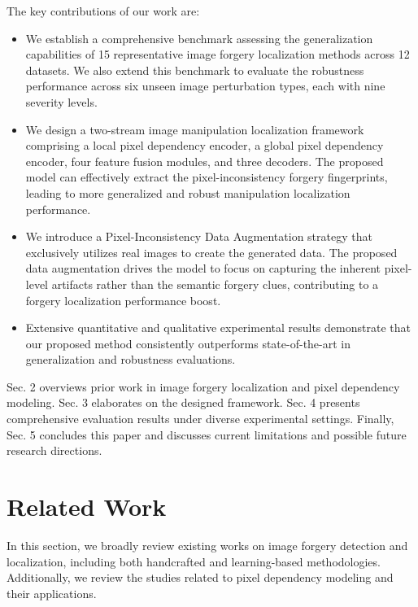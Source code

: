 \documentclass[10pt,journal,compsoc]{IEEEtran}
\begin{document}
The key contributions of our work are:
\begin{itemize}
    \item We establish a comprehensive benchmark assessing the generalization capabilities of 15 representative image forgery localization methods across 12 datasets. We also extend this benchmark to evaluate the robustness performance across six unseen image perturbation types, each with nine severity levels.
    \item We design a two-stream image manipulation localization framework comprising a local pixel dependency encoder, a global pixel dependency encoder, four feature fusion modules, and three decoders. The proposed model can effectively extract the pixel-inconsistency forgery fingerprints, leading to more generalized and robust manipulation localization performance.  
    \item We introduce a Pixel-Inconsistency Data Augmentation strategy that exclusively utilizes real images to create the generated data. The proposed data augmentation drives the model to focus on capturing the inherent pixel-level artifacts rather than the semantic forgery clues, contributing to a forgery localization performance boost. 
    \item Extensive quantitative and qualitative experimental results demonstrate that our proposed method consistently outperforms state-of-the-art in generalization and robustness evaluations. 
\end{itemize}

Sec. 2 overviews prior work in image forgery localization and pixel dependency modeling. Sec. 3  elaborates on the designed framework. Sec. 4 presents comprehensive evaluation results under diverse experimental settings. Finally, Sec. 5 concludes this paper and discusses current limitations and possible future research directions.





\section{Related Work}
In this section, we broadly review existing works on image forgery detection and localization, including both handcrafted and learning-based methodologies. Additionally, we review the studies related to pixel dependency modeling and their applications. 
\end{document}
